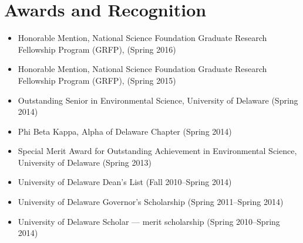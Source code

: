 \section*{Awards and Recognition}

\begin{itemize}
  \item Honorable Mention, National Science Foundation Graduate Research Fellowship Program (GRFP), (Spring 2016)
  \item Honorable Mention, National Science Foundation Graduate Research Fellowship Program (GRFP), (Spring 2015)
  \item Outstanding Senior in Environmental Science, University of Delaware (Spring 2014)
  \item Phi Beta Kappa, Alpha of Delaware Chapter (Spring 2014)
  \item Special Merit Award for Outstanding Achievement in Environmental Science, University of Delaware (Spring 2013)
  \item University of Delaware Dean's List (Fall 2010--Spring 2014)
  \item University of Delaware Governor's Scholarship (Spring 2011--Spring 2014)
  \item University of Delaware Scholar --- merit scholarship (Spring 2010--Spring 2014)
\end{itemize}
